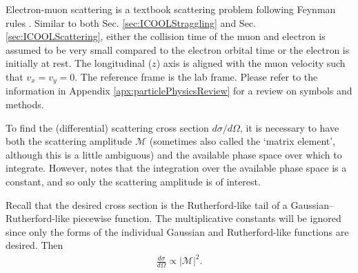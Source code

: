 \label{apx:cosy_cross_section}
 Electron-muon scattering is a textbook scattering problem following Feynman rules \cite{griffithspp}. Similar to both Sec. \ref{sec:ICOOLStraggling} and Sec. \ref{sec:ICOOLScattering}, either the collision time of the muon and electron is assumed to be very small compared to the electron orbital time or the electron is initially at rest. The longitudinal ($z$) axis is aligned with the muon velocity such that $v_x=v_y=0$. The reference frame is the lab frame. Please refer to the information in Appendix \ref{apx:particlePhysicsReview} for a review on symbols and methods.

To find the (differential) scattering cross section $d\sigma/d\Omega$, it is necessary to have both the scattering amplitude $\mathcal{M}$ (sometimes also called the `matrix element', although this is a little ambiguous) and the available phase space over which to integrate. However, \cite{griffithspp} notes that the integration over the available phase space is a constant, and so only the scattering amplitude is of interest.

Recall that the desired cross section is the Rutherford-like tail of a Gaussian--Rutherford-like piecewise function. The multiplicative constants will be ignored since only the forms of the individual Gaussian and Rutherford-like functions are desired. Then
\begin{align*}
\frac{d\sigma}{d\Omega}\propto |\mathcal{M}|^2.
\end{align*}

